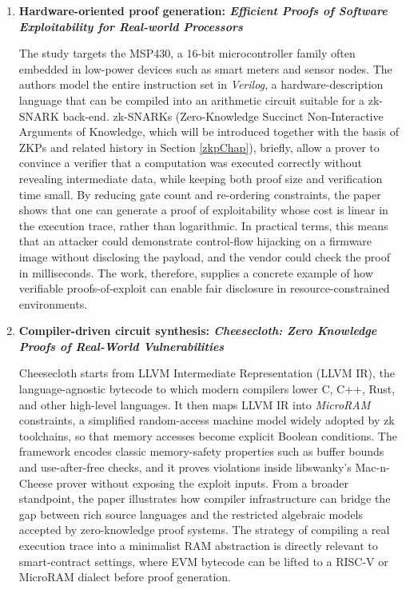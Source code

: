 \begin{enumerate}[label=\arabic*.]

    \item \textbf{Hardware-oriented proof generation: \textit{Efficient Proofs of Software Exploitability for Real-world Processors} \cite{green2023efficient}}\label{sec:green}

          The study targets the MSP430, a 16-bit microcontroller family often embedded in low-power devices such as smart meters and sensor nodes.  
          The authors model the entire instruction set in \textit{Verilog}, a hardware-description language that can be compiled into an arithmetic circuit suitable for a zk-SNARK back-end.  
          zk-SNARKs (Zero-Knowledge Succinct Non-Interactive Arguments of Knowledge, which will be introduced together with the basis of ZKPs and related history in Section \ref{zkpChap}), briefly, allow a prover to convince a verifier that a computation was executed correctly without revealing intermediate data, while keeping both proof size and verification time small.  
          By reducing gate count and re-ordering constraints, the paper shows that one can generate a proof of exploitability whose cost is linear in the execution trace, rather than logarithmic.  
          In practical terms, this means that an attacker could demonstrate control-flow hijacking on a firmware image without disclosing the payload, and the vendor could check the proof in milliseconds.  
          The work, therefore, supplies a concrete example of how verifiable proofs-of-exploit can enable fair disclosure in resource-constrained environments.

    \item \textbf{Compiler-driven circuit synthesis: \textit{Cheesecloth: Zero Knowledge Proofs of Real-World Vulnerabilities} \cite{cuellar2023cheesecloth}}\label{sec:cheesecloth}

          Cheesecloth starts from LLVM Intermediate Representation (LLVM IR), the language-agnostic bytecode to which modern compilers lower C, C++, Rust, and other high-level languages.  
          It then maps LLVM IR into \textit{MicroRAM} constraints, a simplified random-access machine model widely adopted by zk toolchains, so that memory accesses become explicit Boolean conditions.  
          The framework encodes classic memory-safety properties such as buffer bounds and use-after-free checks, and it proves violations inside libswanky’s Mac-n-Cheese\cite{swanky} prover without exposing the exploit inputs.  
          From a broader standpoint, the paper illustrates how compiler infrastructure can bridge the gap between rich source languages and the restricted algebraic models accepted by zero-knowledge proof systems.  
          The strategy of compiling a real execution trace into a minimalist RAM abstraction is directly relevant to smart-contract settings, where EVM bytecode can be lifted to a RISC-V or MicroRAM dialect before proof generation.

\end{enumerate}


